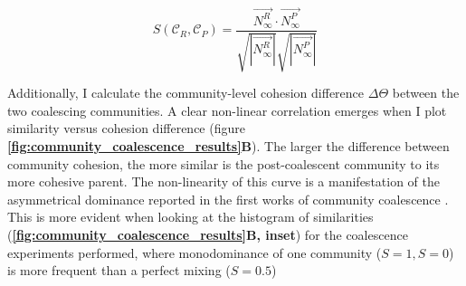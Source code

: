 \documentclass[titlepage,11pt]{article}
\begin{document}
\begin{linenumbers}
\begin{singlespace}
\begin{linenomath*}
	\begin{equation}
	S(\mathcal{C}_R, \mathcal{C}_P) = \frac{\vec{N^R_{\infty}} \cdot \vec{N^P_{\infty}}}{\sqrt{|\vec{N^R_{\infty}}|}\sqrt{|\vec{N^P_{\infty}}|}}
	\end{equation}
\end{linenomath*}
Additionally, I calculate the community-level cohesion difference $ \Delta \Theta $ between the two coalescing communities. A clear non-linear correlation emerges when I plot similarity versus cohesion difference (figure \textbf{\ref{fig:community_coalescence_results}B}). The larger the difference between community cohesion, the more similar is the post-coalescent community to its more cohesive parent. The non-linearity of this curve is a manifestation of the asymmetrical dominance reported in the first works of community coalescence \citep{Gilpin1994}. This is more evident when looking at the histogram of similarities (\textbf{\ref{fig:community_coalescence_results}B, inset}) for the coalescence experiments performed, where monodominance of one community ($ S = 1, S = 0 $) is more frequent than a perfect mixing ($ S = 0.5 $)

\end{singlespace}
\end{linenumbers}
\end{document}
